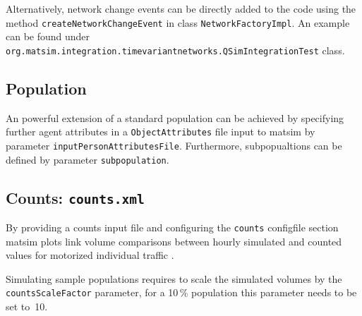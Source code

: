 Alternatively, network change events can be directly added to the code using the method \lstinline|createNetworkChangeEvent| in class \lstinline|NetworkFactoryImpl|. An example can be found under \lstinline|org.matsim.integration.timevariantnetworks.QSimIntegrationTest| class. %
%
%


\subsection{Population}
\label{sec:extending-population}
An powerful extension of a standard population can be achieved by specifying further agent attributes in a \lstinline|ObjectAttributes| file input to \gls{matsim} by parameter \lstinline|inputPersonAttributesFile|. Furthermore, subpopualtions can be defined by parameter \lstinline|subpopulation|.


\subsection{Counts: \lstinline|counts.xml|}
\label{sec:extending-counts}
By providing a counts input file and configuring the \lstinline|counts| \gls{configfile} section \gls{matsim} plots link volume comparisons between hourly simulated and counted values for motorized individual traffic \citep{Horni_unpub_IVT_2007}. 

Simulating sample populations requires to scale the simulated volumes by the \lstinline|countsScaleFactor| parameter, \eg for a 10\,\% population this parameter needs to be set to~10.


